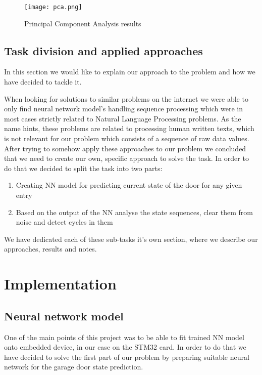 \documentclass[12pt, letterpaper]{article}
\begin{document}
\begin{figure}[H]
    \centering
    \texttt{[image: pca.png]}
    \caption{Principal Component Analysis results}
    \label{fig:pca}
\end{figure}

\subsection{Task division and applied approaches}
In this section we would like to explain our approach to the problem and how we have decided to tackle it.

When looking for solutions to similar problems on the internet we were able to only find neural network model's handling sequence processing which were in most cases strictly related to Natural Language Processing problems. As the name hints, these problems are related to processing human written texts, which is not relevant for our problem which consists of a sequence of raw data values. After trying to somehow apply these approaches to our problem we concluded that we need to create our own, specific approach to solve the task. In order to do that we decided to split the task into two parts:

\begin{enumerate}
    \item Creating NN model for predicting current state of the door for any given entry
    \item Based on the output of the NN analyse the state sequences, clear them from noise and detect cycles in them
\end{enumerate}

We have dedicated each of these sub-tasks it's own section, where we describe our approaches, results and notes.

\newpage
\section{Implementation}

\subsection{Neural network model}
One of the main points of this project was to be able to fit trained NN model onto embedded device, in our case on the STM32 card. In order to do that we have decided to solve the first part of our problem by preparing suitable neural network for the garage door state prediction.
\end{document}
